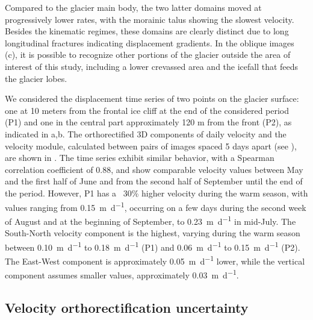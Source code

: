 Compared to the glacier main body, the two latter domains moved at progressively lower
rates, with the morainic talus showing the slowest velocity. Besides the kinematic
regimes, these domains are clearly distinct due to long longitudinal fractures indicating
displacement gradients. In the oblique images (c), it
is possible to recognize other portions of the glacier outside the area of interest of
this study, including a lower crevassed area and the icefall that feeds the glacier
lobes.

We considered the displacement time series of two points on the glacier surface: one at
10 meters from the frontal ice cliff at the end of the considered period (P1) and one in
the central part approximately 120 m from the front (P2), as indicated in
a,b.
The orthorectified 3D components of daily velocity and the velocity module, calculated
between pairs of images spaced 5 days apart (see ), are shown in
.
The time series exhibit similar behavior, with a Spearman correlation coefficient
of 0.88, and show comparable velocity values between May and the first half of June and
from the second half of September until the end of the period.
However, P1 has a ~30\% higher velocity during the warm season, with values ranging from
\SI{0.15}{\meter\per\day}, occurring on a few days during the second week of August and
at the beginning of September, to \SI{0.23}{\meter\per\day} in mid-July.
The South-North velocity component is the highest, varying during the warm season between
\SI{0.10}{\meter\per\day} to \SI{0.18}{\meter\per\day} (P1) and \SI{0.06}{\meter\per\day}
to \SI{0.15}{\meter\per\day} (P2).
The East-West component is approximately \SI{0.05}{\meter\per\day} lower, while the
vertical component assumes smaller values, approximately \SI{0.03}{\meter\per\day}.

\subsection{Velocity orthorectification uncertainty}\label{sec:4:res_velocity_uncertainty}

